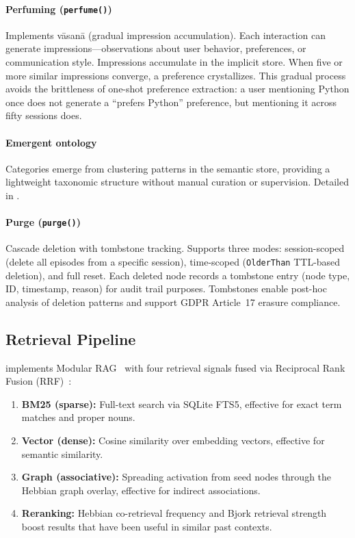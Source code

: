 \paragraph{Perfuming (\texttt{perfume()})}
Implements v\=asan\=a (gradual impression accumulation). Each interaction
can generate impressions---observations about user behavior, preferences,
or communication style. Impressions accumulate in the implicit store. When
five or more similar impressions converge, a preference crystallizes. This
gradual process avoids the brittleness of one-shot preference extraction:
a user mentioning Python once does not generate a ``prefers Python''
preference, but mentioning it across fifty sessions does.

\paragraph{Emergent ontology}
Categories emerge from clustering patterns in the semantic store, providing
a lightweight taxonomic structure without manual curation or supervision.
Detailed in .

\paragraph{Purge (\texttt{purge()})}
Cascade deletion with tombstone tracking. Supports three modes:
session-scoped (delete all episodes from a specific session),
time-scoped (\texttt{OlderThan} TTL-based deletion), and full reset.
Each deleted node records a tombstone entry (node type, ID, timestamp,
reason) for audit trail purposes. Tombstones enable post-hoc analysis
of deletion patterns and support GDPR Article~17 erasure compliance.

\subsection{Retrieval Pipeline}
\label{sec:retrieval}

\alaya{} implements Modular RAG~\cite{gao2023rag} with four retrieval
signals fused via Reciprocal Rank Fusion (RRF)~\cite{cormack2009rrf}:

\begin{enumerate}[nosep]
    \item \textbf{BM25 (sparse):} Full-text search via SQLite FTS5,
    effective for exact term matches and proper nouns.
    \item \textbf{Vector (dense):} Cosine similarity over embedding
    vectors, effective for semantic similarity.
    \item \textbf{Graph (associative):} Spreading activation from seed
    nodes through the Hebbian graph overlay, effective for indirect
    associations.
    \item \textbf{Reranking:} Hebbian co-retrieval frequency and Bjork
    retrieval strength boost results that have been useful in similar past
    contexts.
\end{enumerate}

